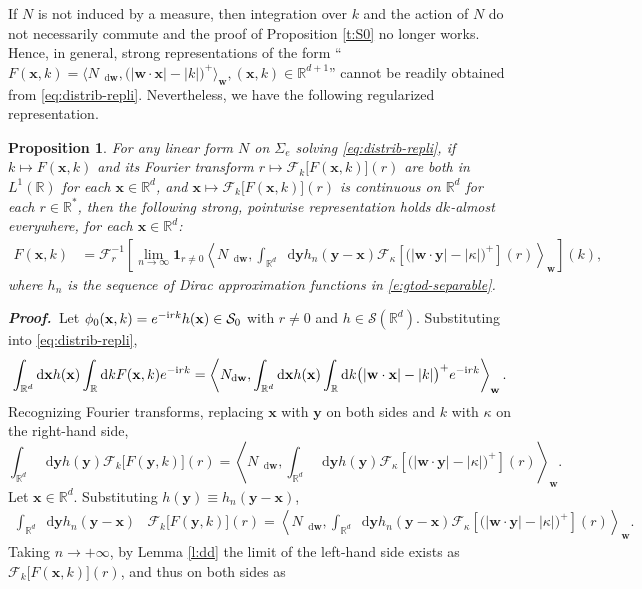 \documentclass[11pt,A4,twoside]{article}
\numberwithin{equation}{section}
\renewcommand{\b}[1]{{\color{blue}#1}}
\newcommand{\F}{\mathcal{F}}
\newcommand{\Fi}{\mathcal{F}^{-1}}
\renewcommand*\d{\mathop{}\!\mathrm{d}}
\newcommand{\inner}[1]{\left\langle#1 \right\rangle}
\newcommand{\x}{\mathbf{x}}
\newcommand{\y}{\mathbf{y}}
\newcommand{\w}{\mathbf{w}}
\newcommand{\R}{\mathbbm{R}}
\renewcommand{\S}{\mathcal{S}}
\newcommand{\intRd}{\int_{\R^d}}
\newcommand{\intR}{\int_{\R}}
\newtheorem{proposition}[theorem]{Proposition}
\theoremstyle{definition}
\theoremstyle{remark}
\def\R{\mathbb{R}}
\def\proof{\noindent \emph{\textbf{Proof.} $\, $}}
\def\theh{\b{h}}\def\theh{h}
\def\thermi{{\rm i}}%
\begin{document}
{If $N$ is not induced by a measure, then integration over $k$ and the action of $N$ do not  necessarily commute and the proof of Proposition \ref{t:S0}  no longer works. Hence, in general, strong representations of the form
``$F(\x,k) 
    =   \big\langle N_{\d \w},   \big(|\w \cdot \x | - |k |\big)^+  \big\rangle_{\w}, (\x, k ) \in\R^{d+1}$'' cannot be readily obtained from  
\eqref{eq:distrib-repli}. Nevertheless, we have the following regularized representation.

\begin{proposition} \label{prop:strong-always}
    For any linear form $N$ on $\Sigma_e$ solving \eqref{eq:distrib-repli}, 
    if $ k \mapsto F(\x,k)$ and its Fourier transform $ r \mapsto \F_k\big[ F(\x,k)\big](r)$ are both in $L^1(\R)$ for each $\x\in\R^d $, and $ \x \mapsto \F_k\big[ F(\x,k)\big](r)$ is continuous on $\R^d$ for each $r\in\R^*$,
    then the following strong, pointwise representation holds $d k$-almost everywhere, for each $\x\in\R^d$:
    \begin{align*}
        F(\x,k) & = \Fi_r\left[\lim_{n\to\infty
        } \mathbf{1}_{r\neq 0} \inner{N_{\d \w}, \intRd \d\y \theh_n(\y-\x)
        \F_\kappa\left[ \big(|\w \cdot \y | - |\kappa |\big)^+\right](r) }_{\w}\right](k),
    \end{align*}    
where $h_n$ is the sequence of Dirac approximation functions in \eqref{e:gtod-separable}.
\end{proposition}
\proof Let $  \phi_0(\x,k) = e^{-\thermi rk} \theh(\x) \in \S_0 $ with $r\neq 0$ and $h\in\S(\R^d)$.
Substituting into \eqref{eq:distrib-repli},
\[
    \intRd \d \x \theh(\x) \intR  \d k F(\x,k) e^{-\thermi rk} 
    =\inner{N_{\d \w}, \intRd \d\x \theh(\x) \intR  \d k \big(|\w \cdot \x | - |k |\big)^+ e^{-\thermi rk}  }_{\w}.  
\]
Recognizing Fourier transforms, 
replacing $\x$ with $\y$ on both sides and $k$ with $\kappa$ on the right-hand side,
\[
    \intRd \d \y \theh(\y) \F_k\big[ F(\y,k)\big](r)
    = 
    \inner{N_{\d \w}, \intRd \d\y \theh(\y) \F_\kappa\left[ \big(|\w \cdot \y | - |\kappa|\big)^+ \right](r) }_{\w}.
\]
Let $\x\in\R^d$. Substituting $\theh(\y)\equiv \theh_n(\y-\x)$,
\begin{align*}
    \intRd \d \y \theh_n(\y-\x)
    & \F_k\big[ F(\y,k)\big](r)
    = 
    \inner{N_{\d \w}, \intRd \d\y \theh_n(\y-\x)
    \F_\kappa\left[ \big(|\w \cdot \y | - |\kappa|\big)^+ \right](r) }_{\w}.
\end{align*}
Taking $ n\to+\infty$, by Lemma \ref{l:dd} the limit of the left-hand side exists as $\F_k\big[F(\x,k)\big](r)$, and thus on both sides as
}
\end{document}
